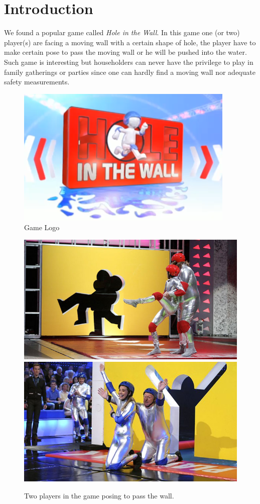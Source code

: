 \documentclass[conference,compsoc]{IEEEtran}
\begin{document}
\section{Introduction}
	\par
		We found a popular game called \textit{Hole in the Wall}. In this game one (or two) player(s) are facing a moving wall with a certain shape of hole, the player have to make certain pose to pass the moving wall or he will be pushed into the water.
		Such game is interesting but householders can never have the privilege to play in family gatherings or parties since one can hardly find a moving wall nor adequate safety measurements.
		\begin{figure}[h]
			\centering
			\includegraphics[width=0.8\linewidth]{./Pic/HIW_Logo}
			\caption{Game Logo}
		\end{figure}
		\begin{figure}[h]
			\centering
			\includegraphics[width=0.45\linewidth]{./Pic/HIW_RedTeam}
			\includegraphics[width=0.45\linewidth]{./Pic/HIW_BlueTeam}
			\caption{Two players in the game posing to pass the wall.}
		\end{figure}
	\par
\end{document}
